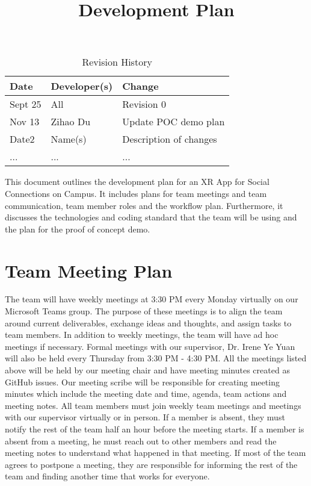 \documentclass{article}
\title{Development Plan\\\progname}
\author{\authname}
\date{}
\begin{document}
\maketitle

\begin{table}[hp]
\caption{Revision History} \label{TblRevisionHistory}
\begin{tabularx}{\textwidth}{llX}
\toprule
\textbf{Date} & \textbf{Developer(s)} & \textbf{Change}\\
\midrule
Sept 25 & All & Revision 0\\
Nov 13 & Zihao Du & Update POC demo plan\\
Date2 & Name(s) & Description of changes\\
... & ... & ...\\
\bottomrule
\end{tabularx}
\end{table}

This document outlines the development plan for an XR App for Social Connections on Campus. It includes plans for team meetings and team communication, team member roles and the workflow plan.  Furthermore,  it discusses the technologies and coding standard that the team will be using and the plan for the proof of concept demo. 

\section{Team Meeting Plan}
\quad The team will have weekly meetings at 3:30 PM every Monday virtually on our Microsoft Teams group. The purpose of these meetings is to align the team around current deliverables, exchange ideas and thoughts, and assign tasks to team members. In addition to weekly meetings,  the team will have ad hoc meetings if necessary. Formal meetings with our supervisor, Dr. Irene Ye Yuan will also be held every Thursday from 3:30 PM - 4:30 PM.  All the meetings listed above will be held by our meeting chair and have meeting minutes created as GitHub issues. Our meeting scribe will be responsible for creating meeting minutes which include the meeting date and time,  agenda, team actions and meeting notes.
\quad All team members must join weekly team meetings and meetings with our supervisor virtually or in person.  If a member is absent,  they must notify the rest of the team half an hour before the meeting starts.  If a member is absent from a meeting,  he must reach out to other members and read the meeting notes to understand what happened in that meeting.  If most of the team agrees to postpone a meeting,  they are responsible for informing the rest of the team and finding another time that works for everyone.
\end{document}
